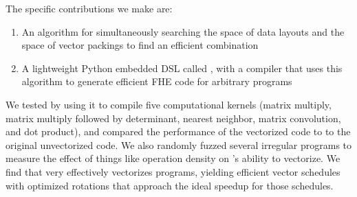 The specific contributions we make are:
\begin{enumerate}
    \item An algorithm for simultaneously searching the space of data layouts and the space of vector packings to find an efficient combination%
    \item A lightweight Python embedded DSL called \system, with a compiler that uses this algorithm to generate efficient FHE code for arbitrary programs
\end{enumerate}

We tested \system by using it to compile five computational kernels (matrix multiply, matrix multiply followed by determinant, nearest neighbor, matrix convolution, and dot product), and compared the performance of the vectorized code to to the original unvectorized code.
We also randomly fuzzed several irregular programs to measure the effect of things like operation density on \system's ability to vectorize. We find that \system very effectively vectorizes programs, yielding efficient vector schedules with optimized rotations that approach the ideal speedup for those schedules.

